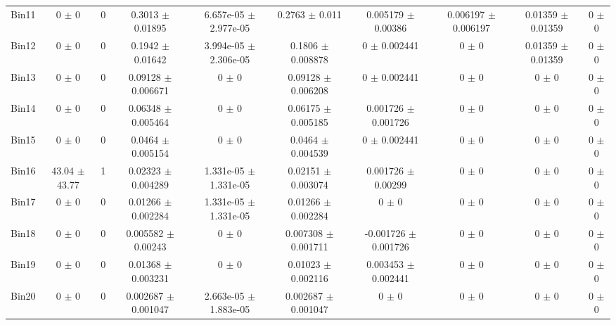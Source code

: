 \begin{tabular}{@{\extracolsep{4pt}}lccccccccc@{}}
     Bin11 & 0 $\pm$ 0 & 0 & 0.3013 $\pm$ 0.01895 & 6.657e-05 $\pm$ 2.977e-05 & 0.2763 $\pm$ 0.011 & 0.005179 $\pm$ 0.00386 & 0.006197 $\pm$ 0.006197 & 0.01359 $\pm$ 0.01359 & 0 $\pm$ 0 \\ 
     Bin12 & 0 $\pm$ 0 & 0 & 0.1942 $\pm$ 0.01642 & 3.994e-05 $\pm$ 2.306e-05 & 0.1806 $\pm$ 0.008878 & 0 $\pm$ 0.002441 & 0 $\pm$ 0 & 0.01359 $\pm$ 0.01359 & 0 $\pm$ 0 \\ 
     Bin13 & 0 $\pm$ 0 & 0 & 0.09128 $\pm$ 0.006671 & 0 $\pm$ 0 & 0.09128 $\pm$ 0.006208 & 0 $\pm$ 0.002441 & 0 $\pm$ 0 & 0 $\pm$ 0 & 0 $\pm$ 0 \\ 
     Bin14 & 0 $\pm$ 0 & 0 & 0.06348 $\pm$ 0.005464 & 0 $\pm$ 0 & 0.06175 $\pm$ 0.005185 & 0.001726 $\pm$ 0.001726 & 0 $\pm$ 0 & 0 $\pm$ 0 & 0 $\pm$ 0 \\ 
     Bin15 & 0 $\pm$ 0 & 0 & 0.0464 $\pm$ 0.005154 & 0 $\pm$ 0 & 0.0464 $\pm$ 0.004539 & 0 $\pm$ 0.002441 & 0 $\pm$ 0 & 0 $\pm$ 0 & 0 $\pm$ 0 \\ 
     Bin16 & 43.04 $\pm$ 43.77 & 1 & 0.02323 $\pm$ 0.004289 & 1.331e-05 $\pm$ 1.331e-05 & 0.02151 $\pm$ 0.003074 & 0.001726 $\pm$ 0.00299 & 0 $\pm$ 0 & 0 $\pm$ 0 & 0 $\pm$ 0 \\ 
     Bin17 & 0 $\pm$ 0 & 0 & 0.01266 $\pm$ 0.002284 & 1.331e-05 $\pm$ 1.331e-05 & 0.01266 $\pm$ 0.002284 & 0 $\pm$ 0 & 0 $\pm$ 0 & 0 $\pm$ 0 & 0 $\pm$ 0 \\ 
     Bin18 & 0 $\pm$ 0 & 0 & 0.005582 $\pm$ 0.00243 & 0 $\pm$ 0 & 0.007308 $\pm$ 0.001711 & -0.001726 $\pm$ 0.001726 & 0 $\pm$ 0 & 0 $\pm$ 0 & 0 $\pm$ 0 \\ 
     Bin19 & 0 $\pm$ 0 & 0 & 0.01368 $\pm$ 0.003231 & 0 $\pm$ 0 & 0.01023 $\pm$ 0.002116 & 0.003453 $\pm$ 0.002441 & 0 $\pm$ 0 & 0 $\pm$ 0 & 0 $\pm$ 0 \\ 
     Bin20 & 0 $\pm$ 0 & 0 & 0.002687 $\pm$ 0.001047 & 2.663e-05 $\pm$ 1.883e-05 & 0.002687 $\pm$ 0.001047 & 0 $\pm$ 0 & 0 $\pm$ 0 & 0 $\pm$ 0 & 0 $\pm$ 0 \\ 
\hline\hline
  \end{tabular}
